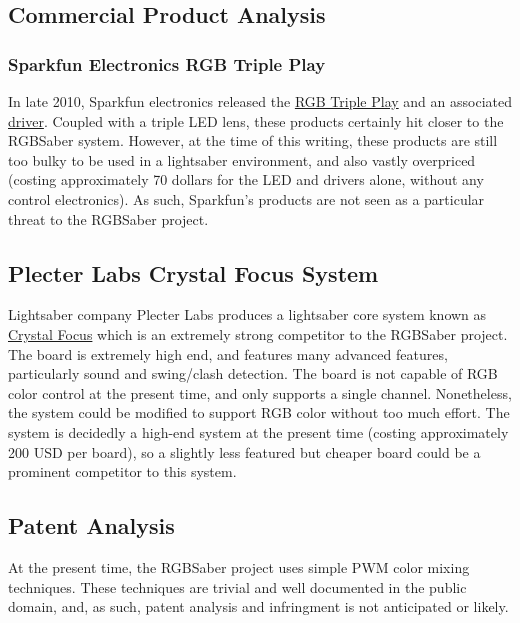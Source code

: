 \documentclass[12pt,letterpaper,onecolumn]{article}
\begin{document}
\subsection[Commercial]{Commercial Product Analysis}
\subsubsection[Sparkfun]{Sparkfun Electronics RGB Triple Play}
In late 2010, Sparkfun electronics released the \href{http://www.sparkfun.com/products/9738}{RGB Triple Play} and an associated \href{http://www.sparkfun.com/products/9834}{driver}.
Coupled with a triple LED lens, these products certainly hit closer to the RGBSaber system. However, at the
time of this writing, these products are still too bulky to be used in a lightsaber environment, and also vastly
overpriced (costing approximately 70 dollars for the LED and drivers alone, without any control electronics).
As such, Sparkfun's products are not seen as a particular threat to the RGBSaber project.

\subsection[Plecter Labs]{Plecter Labs Crystal Focus System}
Lightsaber company Plecter Labs produces a lightsaber core system known as \href{http://www.plecterlabs.com/catalog/product_info.php?cPath=23&products_id=149}{Crystal Focus}
which is an extremely strong competitor to the RGBSaber project. The board is extremely high end, and 
features many advanced features, particularly sound and swing/clash detection.  The board is not capable
of RGB color control at the present time, and only supports a single channel. Nonetheless, the system
could be modified to support RGB color without too much effort. The system is decidedly a high-end
system at the present time (costing approximately 200 USD per board), so a slightly less featured but
cheaper board could be a prominent competitor to this system.

\subsection[Patent]{Patent Analysis}
At the present time, the RGBSaber project uses simple PWM color mixing techniques. These techniques are
trivial and well documented in the public domain, and, as such, patent analysis and infringment is not
anticipated or likely.

\end{document}
